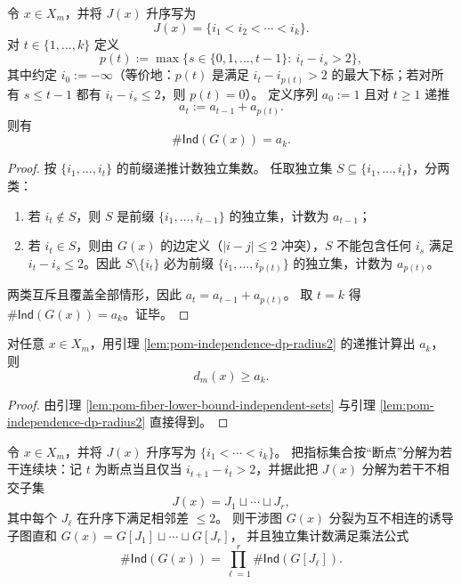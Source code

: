 \begin{lemma}[独立集计数的线性时间递推（半径 2 冲突）]\label{lem:pom-independence-dp-radius2}
令 $x\in X_m$，并将 $J(x)$ 升序写为
\[
J(x)=\{i_1<i_2<\cdots<i_k\}.
\]
对 $t\in\{1,\dots,k\}$ 定义
\[
p(t):=\max\{s\in\{0,1,\dots,t-1\}:\ i_t-i_s>2\},
\]
其中约定 $i_0:=-\infty$（等价地：$p(t)$ 是满足 $i_t-i_{p(t)}>2$ 的最大下标；若对所有 $s\le t-1$ 都有 $i_t-i_s\le 2$，则 $p(t)=0$）。
定义序列 $a_0:=1$ 且对 $t\ge 1$ 递推
\[
a_t:=a_{t-1}+a_{p(t)}.
\]
则有
\[
\#\mathsf{Ind}(G(x))=a_k.
\]
\end{lemma}

\begin{proof}
按 $\{i_1,\dots,i_t\}$ 的前缀递推计数独立集数。
任取独立集 $S\subseteq\{i_1,\dots,i_t\}$，分两类：
\begin{enumerate}
  \item 若 $i_t\notin S$，则 $S$ 是前缀 $\{i_1,\dots,i_{t-1}\}$ 的独立集，计数为 $a_{t-1}$；
  \item 若 $i_t\in S$，则由 $G(x)$ 的边定义（$|i-j|\le 2$ 冲突），$S$ 不能包含任何 $i_s$ 满足 $i_t-i_s\le 2$。因此 $S\setminus\{i_t\}$ 必为前缀 $\{i_1,\dots,i_{p(t)}\}$ 的独立集，计数为 $a_{p(t)}$。
\end{enumerate}
两类互斥且覆盖全部情形，因此 $a_t=a_{t-1}+a_{p(t)}$。
取 $t=k$ 得 $\#\mathsf{Ind}(G(x))=a_k$。证毕。
\end{proof}

\begin{corollary}[一个可计算的纤维下界]\label{cor:pom-fiber-lower-bound-dp}
对任意 $x\in X_m$，用引理 \ref{lem:pom-independence-dp-radius2} 的递推计算出 $a_k$，则
\[
d_m(x)\ge a_k.
\]
\end{corollary}

\begin{proof}
由引理 \ref{lem:pom-fiber-lower-bound-independent-sets} 与引理 \ref{lem:pom-independence-dp-radius2} 直接得到。
\end{proof}

\begin{lemma}[干涉图的块分解与独立集乘法公式]\label{lem:pom-ind-factorization}
令 $x\in X_m$，并将 $J(x)$ 升序写为 $\{i_1<\cdots<i_k\}$。
把指标集合按“断点”分解为若干连续块：记 $t$ 为断点当且仅当 $i_{t+1}-i_t>2$，并据此把 $J(x)$ 分解为若干不相交子集
\[
J(x)=J_1\sqcup\cdots\sqcup J_r,
\]
其中每个 $J_\ell$ 在升序下满足相邻差 $\le 2$。
则干涉图 $G(x)$ 分裂为互不相连的诱导子图直和
\(
G(x)=G[J_1]\sqcup\cdots\sqcup G[J_r]
\)，
并且独立集计数满足乘法公式
\[
\#\mathsf{Ind}(G(x))=\prod_{\ell=1}^r \#\mathsf{Ind}(G[J_\ell]).
\]
\end{lemma}

